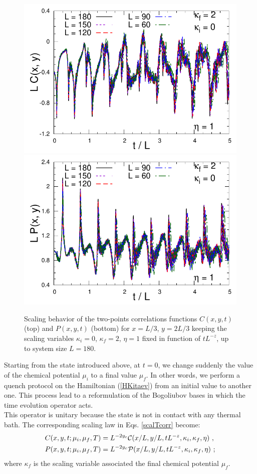 \documentclass[pra,twocolumn,preprintnumbers,amsmath,amssymb,nofootinbib,floatfix,longbibliography]{revtex4}
\begin{document}
\begin{figure}[!htb]
  \includegraphics[width=0.95\columnwidth]
  {figs/Cqthk0q2e1.pdf}
    \includegraphics[width=0.95\columnwidth]
    {figs/Pqthk0q2e1.pdf}
    \caption{Scaling behavior of the two-points
    correlations functions $C(x,y,t)$ (top) and $P(x,y,t)$
    (bottom) for $x=L/3$, $y=2L/3$  keeping the scaling
variables $\kappa_i=0$,
    $\kappa_f=2$, $\eta =1$ fixed in function of $tL^{-z}$,
    up to system size $L=180$.}
  \label{qthk0q2e1}
\end{figure}

Starting from the state introduced above, at $t=0$, we
change suddenly the value of the chemical potential $\mu_i$
to a final value $\mu_f$. In other words, we perform a
quench protocol on the Hamiltonian (\ref{HKitaev}) from an
initial value to another one. This process lead to a
reformulation of the Bogoliubov bases in which the time
evolution operator acts. \\
This operator is unitary because the state is not in
contact with any thermal bath. The corresponding scaling
law in Eqs. \ref{scalTcorr} become:
\begin{align}
  \label{scalTquench}
  C(x,y,t;\mu_i,\mu_f,T) & = L^{-2y_c} {\cal C}(x/L,y/L,
  tL^{-z},\kappa_i,\kappa_f, \eta) \,\,,\\
  P(x,y,t;\mu_i,\mu_f,T) & = L^{-2y_c} {\cal P}(x/L, y/L,
  tL^{-z},\kappa_i,\kappa_f, \eta) \,\,;
\end{align}
where $\kappa_f$ is the scaling variable associated the
final chemical potential $\mu_f$.\\
\end{document}
